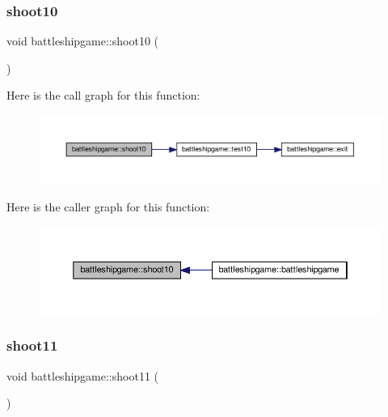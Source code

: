\subsubsection{\texorpdfstring{shoot10}{shoot10}}
{\footnotesize\ttfamily void battleshipgame\+::shoot10 (\begin{DoxyParamCaption}{ }\end{DoxyParamCaption})\hspace{0.3cm}{\ttfamily [slot]}}

Here is the call graph for this function\+:
\nopagebreak
\begin{figure}[H]
\begin{center}
\leavevmode
\includegraphics[width=350pt]{classbattleshipgame_a573cf39fd3700ffd3a79587437d66d37_cgraph}
\end{center}
\end{figure}
Here is the caller graph for this function\+:
\nopagebreak
\begin{figure}[H]
\begin{center}
\leavevmode
\includegraphics[width=350pt]{classbattleshipgame_a573cf39fd3700ffd3a79587437d66d37_icgraph}
\end{center}
\end{figure}
\mbox{\label{classbattleshipgame_abe53aab52ef793e5ca534fa53768ca49}} 
\subsubsection{\texorpdfstring{shoot11}{shoot11}}
{\footnotesize\ttfamily void battleshipgame\+::shoot11 (\begin{DoxyParamCaption}{ }\end{DoxyParamCaption})\hspace{0.3cm}{\ttfamily [slot]}}

